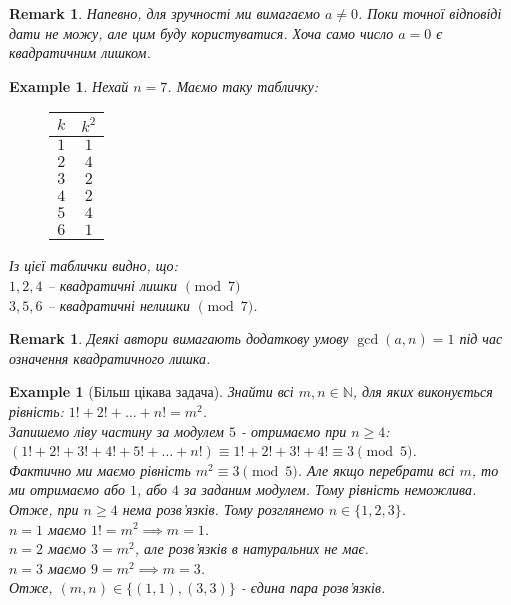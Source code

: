 \documentclass[a4paper, 14pt]{extarticle}
\theoremstyle{theoremdd}
\theoremstyle{theoremdd}
\theoremstyle{theoremdd}
\theoremstyle{theoremdd}
\newtheorem{example}[theorem]{Example}
\theoremstyle{theoremdd}
\theoremstyle{theoremdd}
\newtheorem{remark}[theorem]{Remark}
\theoremstyle{theoremdd}
\theoremstyle{theoremdd}
\begin{document}
\begin{remark}
Напевно, для зручності ми вимагаємо $a \neq 0$. Поки точної відповіді дати не можу, але цим буду користуватися. Хоча само число $a = 0$ є квадратичним лишком.
\end{remark}

\begin{example}
Нехай $n = 7$. Маємо таку табличку:
\begin{figure}[H]
\centering
\begin{tabular}{c|c}
$k$ & $k^2$ \\
\hline
$1$ & $1$ \\
\hline
$2$ & $4$ \\
\hline
$3$ & $2$ \\
\hline
$4$ & $2$ \\
\hline
$5$ & $4$ \\
\hline
$6$ & $1$
\end{tabular}
\end{figure}
Із цієї таблички видно, що:\\
$1,2,4$ -- квадратичні лишки $\pmod 7$\\
$3,5,6$ -- квадратичні нелишки $\pmod 7$.
\end{example}

\iffalse
\begin{remark}
Michael Penn допустився помилки під час визначення квадратичного лишка. У нього була умова $\gcd(a,n) = 1$, що не обов'язкова. Хоча на майбутнє це буде потрібно.\\
Зокрема $4$ - квадратичний лишок $\pmod 6$, тому що $4 \equiv 2^2 \pmod 6$, хоча тут $\gcd(4,6) \neq 2$.
\end{remark}
\fi

\begin{remark}
Деякі автори вимагають додаткову умову $\gcd(a,n) = 1$ під час означення квадратичного лишка.
\end{remark}

\begin{example}[Більш цікава задача]
Знайти всі $m,n \in \mathbb{N}$, для яких виконується рівність: $1! + 2! + \dots + n! = m^2$.\\
Запишемо ліву частину за модулем $5$ - отримаємо при $n \geq 4$:\\
$(1! + 2! + 3! + 4! + 5! + \dots + n!) \equiv 1! + 2! + 3! + 4! \equiv 3 \pmod 5$.\\
Фактично ми маємо рівність $m^2 \equiv 3 \pmod 5$. Але якщо перебрати всі $m$, то ми отримаємо або $1$, або $4$ за заданим модулем. Тому рівність неможлива.\\
Отже, при $n \geq 4$ нема розв'язків. Тому розглянемо $n \in \{1,2,3\}$.\\
$n = 1$ маємо $1! = m^2 \implies m = 1$.\\
$n = 2$ маємо $3 = m^2$, але розв'язків в натуральних не має.\\
$n = 3$ маємо $9 = m^2 \implies m = 3$.\\
Отже, $(m,n) \in \{(1,1),(3,3)\}$ - єдина пара розв'язків.
\end{example}
\end{document}
